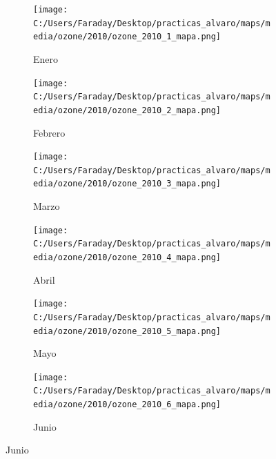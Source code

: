 \documentclass[12pt]{article}
\begin{document}
\begin{figure}[H]
\centering
\begin{subfigure}[H]{0.15\textwidth}
\texttt{[image: C:/Users/Faraday/Desktop/practicas\_alvaro/maps/media/ozone/2010/ozone\_2010\_1\_mapa.png]}
\captionsetup{labelformat=empty}
\caption{Enero}
\label{fig:map-ozone-2010-1}
\end{subfigure}
%
\begin{subfigure}[H]{0.15\textwidth}
\texttt{[image: C:/Users/Faraday/Desktop/practicas\_alvaro/maps/media/ozone/2010/ozone\_2010\_2\_mapa.png]}
\captionsetup{labelformat=empty}
\caption{Febrero}
\label{fig:map-ozone-2010-2}
\end{subfigure}
%
\begin{subfigure}[H]{0.15\textwidth}
\texttt{[image: C:/Users/Faraday/Desktop/practicas\_alvaro/maps/media/ozone/2010/ozone\_2010\_3\_mapa.png]}
\captionsetup{labelformat=empty}
\caption{Marzo}
\label{fig:map-ozone-2010-3}
\end{subfigure}
%
\begin{subfigure}[H]{0.15\textwidth}
\texttt{[image: C:/Users/Faraday/Desktop/practicas\_alvaro/maps/media/ozone/2010/ozone\_2010\_4\_mapa.png]}
\captionsetup{labelformat=empty}
\caption{Abril}
\label{fig:map-ozone-2010-4}
\end{subfigure}
%
\begin{subfigure}[H]{0.15\textwidth}
\texttt{[image: C:/Users/Faraday/Desktop/practicas\_alvaro/maps/media/ozone/2010/ozone\_2010\_5\_mapa.png]}
\captionsetup{labelformat=empty}
\caption{Mayo}
\label{fig:map-ozone-2010-5}
\end{subfigure}
%
\begin{subfigure}[H]{0.15\textwidth}
\texttt{[image: C:/Users/Faraday/Desktop/practicas\_alvaro/maps/media/ozone/2010/ozone\_2010\_6\_mapa.png]}
\captionsetup{labelformat=empty}
\caption{Junio}
\label{fig:map-ozone-2010-6}
\end{subfigure}


\end{figure}
\end{document}
